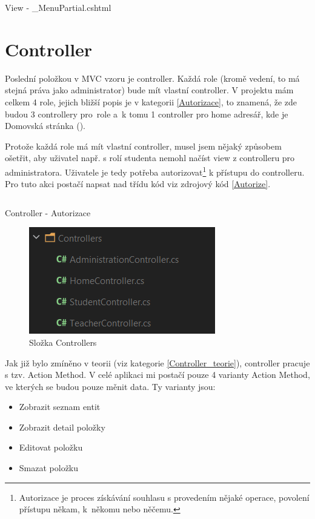 \documentclass[a4paper, 12pt]{report}
\begin{document}
	\begin{listing}[H]
		\inputminted{html}{SourceCode/Views/Shared/_MenuPartial.html}
		\caption{View - \_MenuPartial.cshtml}
		\label{sharedmenupartial}
	\end{listing}

	\section{Controller}
	Poslední položkou v MVC vzoru je controller. Každá role (kromě vedení, to má stejná práva jako administrator) bude mít vlastní controller. V projektu mám celkem 4 role, jejich bližší popis je v kategorii \ref{Autorizace}, to znamená, že zde budou 3 controllery pro~role a~k tomu 1 controller pro home adresář, kde je Domovská stránka ().\par
	Protože každá role má mít vlastní controller, musel jsem nějaký způsobem ošetřit, aby uživatel např. s rolí studenta nemohl načíst view z controlleru pro administratora. Uživatele je tedy potřeba autorizovat\footnote{Autorizace je proces získávání souhlasu s provedením nějaké operace, povolení přístupu někam, k~někomu nebo něčemu.\cite{Autorizace}} k přístupu do controlleru. Pro tuto akci postačí napsat nad třídu kód viz zdrojový kód \ref{Autorize}.
	\begin{listing}[H]
		\inputminted{csharp}{SourceCode/Controllers/Autorize.cs}
		\caption{Controller - Autorizace}
		\label{Autorize}
	\end{listing}
	\begin{figure}[H]
		\centering
		\includegraphics[scale=1]{Contollers}
		\caption{Složka Controllers}
		\label{Controllers}
	\end{figure}
	Jak již bylo zmíněno v teorii (viz kategorie \ref{Controller_teorie}), controller pracuje s tzv. Action Method. V celé aplikaci mi postačí pouze 4 varianty Action Method, ve kterých se budou pouze měnit data. Ty varianty jsou:
	\begin{itemize}
		\item Zobrazit seznam entit
		\item Zobrazit detail položky
		\item Editovat položku
		\item Smazat položku
	\end{itemize}\par
\end{document}
